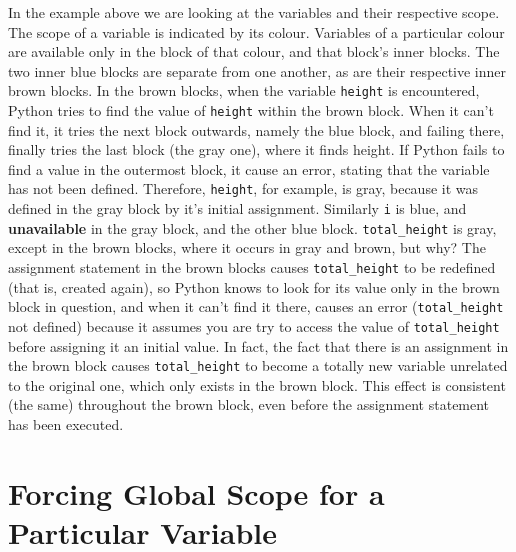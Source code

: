 In the example above we are looking at the variables and their   respective scope. The scope of a variable is indicated by its colour.   Variables of a particular colour are available only in the block of   that colour, and that block's inner blocks. The two inner blue blocks   are separate from one another, as are their respective inner brown   blocks. In the brown blocks, when the variable \texttt{height} is encountered,   Python tries to find the value of \texttt{height} within the brown block. When it   can't find it, it tries the next block outwards, namely the blue block,   and failing there, finally tries the last block (the gray one), where   it finds height. If Python fails to find a value in the outermost   block, it cause an error, stating that the variable has not been   defined.  Therefore, \texttt{height}, for example, is gray, because it was   defined in the gray block by it's initial assignment. Similarly \texttt{i}   is blue, and \textbf{unavailable} in the gray block, and the   other blue block. \texttt{total\_height} is gray, except in the brown blocks,   where it occurs in gray and brown, but why? The assignment statement   in the brown blocks causes \texttt{total\_height} to be redefined (that is, created again), so Python   knows to look for its value only in the brown block in question, and   when it can't find it there, causes an error (\texttt{total\_height} not   defined) because it assumes you are try to access the value of \texttt{total\_height}   before assigning it an initial value. In fact, the fact that there is an   assignment in the brown block causes \texttt{total\_height} to become a totally   new variable unrelated to the original one, which only exists in the   brown block.  This effect is consistent (the same) throughout the brown block,   even before the assignment statement has been executed.

\section{Forcing Global Scope for a Particular Variable}

